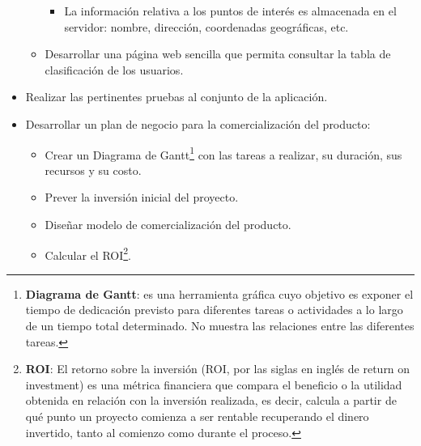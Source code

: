 \begin{itemize}
\begin{itemize}
\begin{itemize}
        \item La información relativa a los puntos de interés es almacenada en el servidor: nombre, dirección, coordenadas geográficas, etc.
        
        \end{itemize}
    
    \item Desarrollar una página web sencilla que permita consultar la tabla de clasificación de los usuarios.
    
    \end{itemize}
\item Realizar las pertinentes pruebas al conjunto de la aplicación.

\item Desarrollar un plan de negocio para la comercialización del producto:

    \begin{itemize}
    
    \item Crear un Diagrama de Gantt\footnote{\textbf{Diagrama de Gantt}: es una herramienta gráfica cuyo objetivo es exponer el tiempo de dedicación previsto para diferentes tareas o actividades a lo largo de un tiempo total determinado. No muestra las relaciones entre las diferentes tareas.} con las tareas a realizar, su duración, sus recursos y su costo.
    
    \item Prever la inversión inicial del proyecto.
    
    \item Diseñar modelo de comercialización del producto.
    
    \item Calcular el ROI\footnote{\textbf{ROI}: El retorno sobre la inversión (ROI, por las siglas en inglés de return on investment) es una métrica financiera que compara el beneficio o la utilidad obtenida en relación con la inversión realizada, es decir, calcula a partir de qué punto un proyecto comienza a ser rentable recuperando el dinero invertido, tanto al comienzo como durante el proceso.}.
    
    \end{itemize}
    
\end{itemize}
